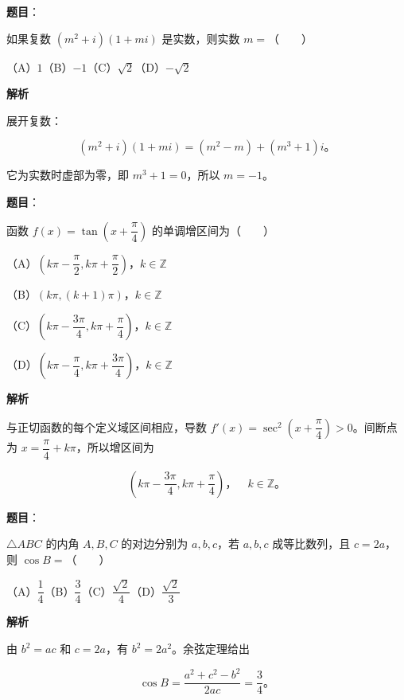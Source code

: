 \begin{answer}

\textbf{题目}：

如果复数 $(m^2+i)(1+mi)$ 是实数，则实数 $m=$\mbox{（　　）}

（A）$1$\quad（B）$-1$\quad（C）$\sqrt2$\quad（D）$-\sqrt2$

\textbf{解析}

展开复数：

\nopagebreak[4]
\[
(m^2+i)(1+mi)=(m^2-m)+(m^3+1)i\text{。}
\]

它为实数时虚部为零，即 $m^3+1=0$，所以 $m=-1$。


\end{answer}
\begin{answer}

\textbf{题目}：

函数 $f(x)=\tan\left(x+\dfrac\pi4\right)$ 的单调增区间为\mbox{（　　）}

（A）$\left(k\pi-\dfrac\pi2,k\pi+\dfrac\pi2\right)$，$k\in\mathbb Z$

（B）$(k\pi,(k+1)\pi)$，$k\in\mathbb Z$

（C）$\left(k\pi-\dfrac{3\pi}4,k\pi+\dfrac\pi4\right)$，$k\in\mathbb Z$

（D）$\left(k\pi-\dfrac\pi4,k\pi+\dfrac{3\pi}4\right)$，$k\in\mathbb Z$

\textbf{解析}

与正切函数的每个定义域区间相应，导数 $f'(x)=\sec^2\left(x+\dfrac\pi4\right)>0$。间断点为 $x=\dfrac\pi4+k\pi$，所以增区间为

\nopagebreak[4]
\[
\left(k\pi-\frac{3\pi}4,k\pi+\frac\pi4\right)\text{，}\quad k\in\mathbb Z\text{。}
\]


\end{answer}
\begin{answer}

\textbf{题目}：

$\triangle ABC$ 的内角 $A,B,C$ 的对边分别为 $a,b,c$，若 $a,b,c$ 成等比数列，且 $c=2a$，则 $\cos B=$\mbox{（　　）}

（A）$\dfrac14$\quad（B）$\dfrac34$\quad（C）$\dfrac{\sqrt2}4$\quad（D）$\dfrac{\sqrt2}3$

\textbf{解析}

由 $b^2=ac$ 和 $c=2a$，有 $b^2=2a^2$。余弦定理给出

\nopagebreak[4]
\[
\cos B=\frac{a^2+c^2-b^2}{2ac}=\frac34\text{。}
\]


\end{answer}

